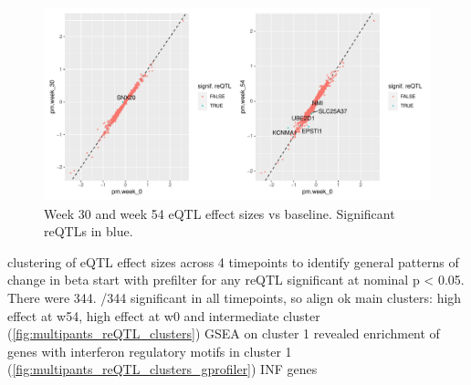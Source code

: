 \begin{outline}
\begin{figure}
    \centering
    \includegraphics[width=1.0\textwidth,page=1]{mainmatter/figures/chapter_04/plot_dge_eqtl.pm_w30_vs_w0_and_w54_vs_w0}
    \caption{Week 30 and week 54 eQTL effect sizes vs baseline. Significant reQTLs in blue.}
    \label{fig:multipants_reQTL_pm_w30_vs_w0_and_w54_vs_w0}
\end{figure}

\1 clustering of eQTL effect sizes across 4 timepoints to identify general patterns of change in beta 
    \2 start with prefilter for any reQTL significant at nominal p < 0.05. There were 344.
        /344 significant in all timepoints, so align ok
     main clusters: high effect at w54, high effect at w0 and intermediate cluster (\autoref{fig:multipants_reQTL_clusters}) 
    \2 GSEA on cluster 1 revealed enrichment of genes with interferon regulatory motifs in cluster 1 (\autoref{fig:multipants_reQTL_clusters_gprofiler})
     INF genes
    

\end{outline}
